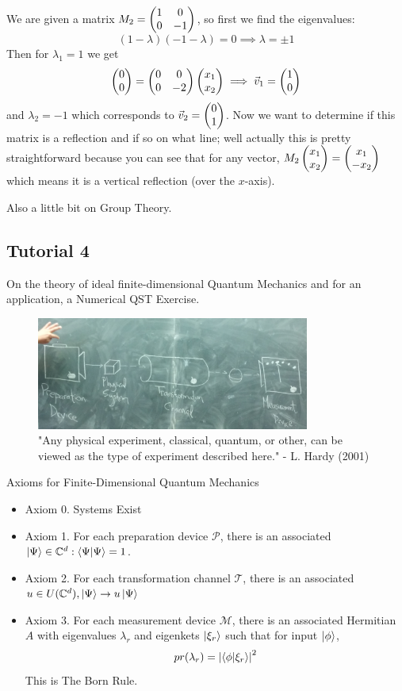 \documentclass[english, 11pt]{article}
\begin{document}
      We are given a matrix $M_2 = \left(\begin{matrix}1 & 0 \\ 0 & -1\end{matrix}\right)$, so first we find the eigenvalues:
      \[ (1-\lambda)(-1 - \lambda) = 0 \implies \lambda = \pm 1 \]
      Then for $\lambda_1 = 1$ we get
      \[ \left(\begin{matrix}0\\0\end{matrix}\right) = \left(\begin{matrix}0 & 0 \\ 0 & -2\end{matrix}\right)\left(\begin{matrix}x_1 \\ x_2\end{matrix}\right) \implies {\vec{v}}_1 = \left(\begin{matrix}1 \\ 0\end{matrix}\right) \]
      and $\lambda_2 = -1$ which corresponds to ${\vec{v}}_2 = \left(\begin{matrix}0 \\ 1\end{matrix}\right)$. Now we want to determine if this matrix is a reflection and if so on what line; well actually this is pretty straightforward because you can see that for any vector, $M_2\left(\begin{matrix}x_1\\x_2\end{matrix}\right) = \left(\begin{matrix}x_1\\-x_2\end{matrix}\right)$ which means it is a vertical reflection (over the $x$-axis).
      \newline

      Also a little bit on Group Theory.

     \subsection{Tutorial 4}

      On the theory of ideal finite-dimensional Quantum Mechanics and for an application, a Numerical QST Exercise.

      \begin{figure}[b!]
            \centering
            \includegraphics[width=0.8\textwidth]{any_physics.png}
            \caption{"Any physical experiment, classical, quantum, or other, can be viewed as the type of experiment described here." - L. Hardy (2001)}
      \end{figure}

      Axioms for Finite-Dimensional Quantum Mechanics

      \begin{itemize}
        \item Axiom 0. Systems Exist
        \item Axiom 1. For each preparation device $\mathcal{P}$, there is an associated $\kpsi \in \C^d : \braket{\Psi}{\Psi} = 1$.
        \item Axiom 2. For each transformation channel $\mathcal{T}$, there is an associated $u \in U({\mathbb{C}}^d), \left|\Psi\right\rangle \rightarrow u\left|\Psi\right\rangle$
        \item Axiom 3. For each measurement device $\mathcal{M}$, there is an associated Hermitian $A$ with eigenvalues $\lambda_r$ and eigenkets $\left|\xi_r\right\rangle$ such that for input $\left|\phi\right\rangle$,
        \[ pr(\lambda_r) = \left| \braket{\phi}{\xi_r}\right|^2 \]
        This is The Born Rule.
      \end{itemize}
\end{document}
